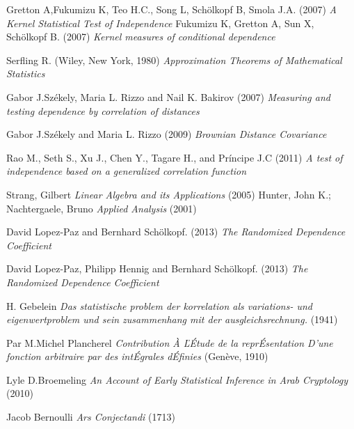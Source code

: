 \documentclass[epsbased,copyright,final,english,printable,covers,extendedindex,firstnumbered,tfg,gnuplot]{tfgtfmthesisuam}
\begin{document}
\begin{thebibliography}{9}

 Gretton A,Fukumizu K, Teo H.C., Song L, Schölkopf B, Smola J.A.
(2007)
\textit{A Kernel Statistical Test of Independence}
 Fukumizu K, Gretton A, Sun X, Schölkopf B. (2007)
\textit{Kernel measures of conditional dependence}
 
 Serfling R.
(Wiley, New York, 1980)
\textit{Approximation Theorems of Mathematical Statistics}

 Gabor J.Székely, Maria L. Rizzo and Nail K. Bakirov
(2007)
\textit{Measuring and testing dependence by correlation of distances}

 Gabor J.Székely and Maria L. Rizzo
(2009)
\textit{Brownian Distance Covariance}

 Rao M., Seth S., Xu J., Chen Y., Tagare H., and Príncipe J.C (2011)
\textit{A test of independence based on a generalized correlation function}

 Strang, Gilbert 
\textit{Linear Algebra and its Applications}
(2005)
 Hunter, John K.; Nachtergaele, Bruno 
\textit{ Applied Analysis}
(2001)

 David Lopez-Paz and Bernhard Schölkopf.
(2013)
\textit{The Randomized Dependence Coefficient}

 David Lopez-Paz, Philipp Hennig and Bernhard Schölkopf.
(2013)
\textit{The Randomized Dependence Coefficient}

 H. Gebelein
\textit{Das statistische problem der korrelation als variations- und eigenwertproblem und sein zusammenhang mit der ausgleichsrechnung.} (1941)

 Par M.Michel Plancherel
\textit{Contribution À ĽÉtude de la reprÉsentation D’une fonction arbitraire par des intÉgrales dÉfinies}
(Genève, 1910)

 Lyle D.Broemeling
\textit{An Account of Early Statistical Inference in Arab Cryptology}
(2010)

  Jacob Bernoulli
\textit{Ars Conjectandi}
(1713)

\end{thebibliography}
\end{document}
